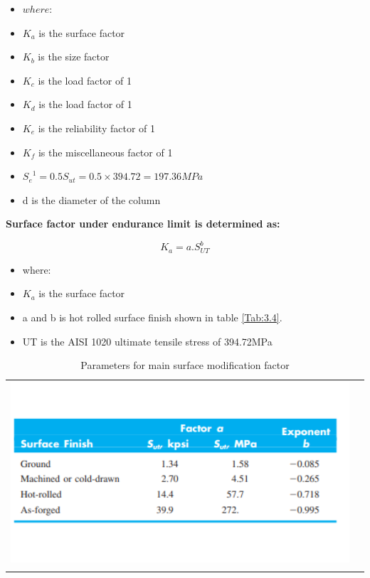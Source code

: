 {\begin{itemize}[label={}]
    \item \(where:\)
    \item \(K_a\) is the surface factor 
    \item \(K_b\) is the size factor
    \item \(K_c\) is the  load factor of 1
    \item \(K_d\) is the load factor  of 1
    \item \(K_e\) is the reliability factor  of 1
    \item \(K_f\) is the miscellaneous factor of 1
    \item \({S_e}^1 = 0.5 {S}_{{ut}} = 0.5 \times 394.72 = 197.36MPa\)
     \item d is the diameter of the column
\end{itemize}


\textbf{Surface factor under endurance limit is determined as:} 

\begin{equation}
    K_a = a .{S}_{{UT}}^{b}
\end{equation}

\begin{itemize}[label={}]
    \item where:
    \item \(K_a\) is the surface factor
    \item a and b is hot rolled surface finish shown in table \ref{Tab:3.4}.
    \item UT is the AISI 1020 ultimate tensile stress of 394.72MPa
   
\end{itemize}


\begin{table}[htp]
\caption{Parameters for main surface modification factor}
\centering
\begin{tabular}{c r} 
\includegraphics[width=5in]{Figures/surface_finish.png} \label{Tab:3.4}\\
\cite{horger1965metals}
\end{tabular}
\label{tab:hresult}
\end{table}

}

